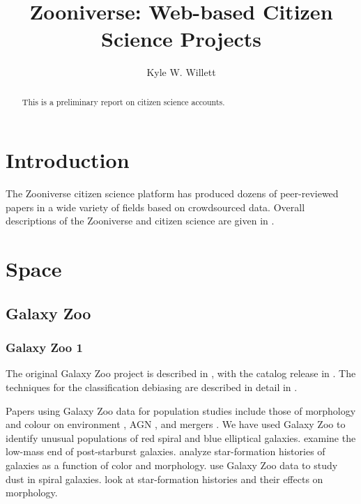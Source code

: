 \documentclass[twocolumn]{aastex6}
\begin{document}
\title{Zooniverse: Web-based Citizen Science Projects}

\author{Kyle W. Willett}

\begin{abstract}
This is a preliminary report on citizen science accounts.
\end{abstract}


\section{Introduction}

The Zooniverse citizen science platform has produced dozens of peer-reviewed papers in a wide variety of fields based on crowdsourced data. Overall descriptions of the Zooniverse and citizen science are given in \citet{cle11,for12,mas13,sim14a,mar15}.

\section{Space}

\subsection{Galaxy Zoo}

\subsubsection{Galaxy Zoo 1}

The original Galaxy Zoo project is described in \citet{lin08}, with the catalog release in \citet{lin11}. The techniques for the classification debiasing are described in detail in \citet{bam09}. 

Papers using Galaxy Zoo data for population studies include those of morphology and colour on environment \citep{bam09,ski09,hoy12}, AGN \citep{sch10a,sme16}, and mergers \citep{dar10,dar10a,dar11b,ten12}. We have used Galaxy Zoo to identify unusual populations of red spiral \citep{mas10a,cor12} and blue elliptical \citep{sch09} galaxies. \citet{won12} examine the low-mass end of post-starburst galaxies. \citet{toj13} analyze star-formation histories of galaxies as a function of color and morphology. \citet{mas10b} use Galaxy Zoo data to study dust in spiral galaxies. \citet{sch14,sme15} look at star-formation histories and their effects on morphology.
\end{document}
